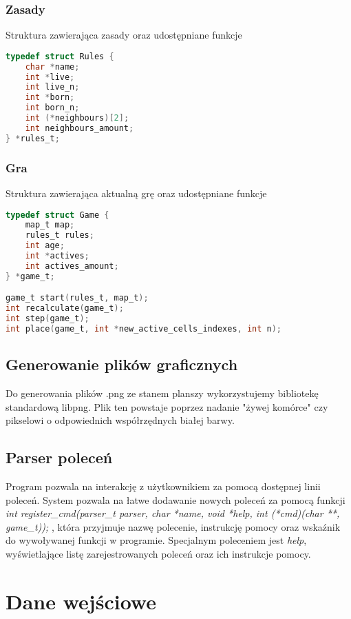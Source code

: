 \documentclass{article}
\begin{document}
\subsubsection{Zasady}
Struktura zawierająca zasady oraz udostępniane funkcje

\begin{lstlisting}[language=C]
typedef struct Rules {
	char *name;
    int *live;
	int live_n;
	int *born;
	int born_n;
	int (*neighbours)[2];
	int neighbours_amount;
} *rules_t;
\end{lstlisting}

\subsubsection{Gra}
Struktura zawierająca aktualną grę oraz udostępniane funkcje

\begin{lstlisting}[language=C]
typedef struct Game {
	map_t map;
	rules_t rules;
    int age;
	int *actives;
	int actives_amount;
} *game_t;

game_t start(rules_t, map_t);
int recalculate(game_t);
int step(game_t);
int place(game_t, int *new_active_cells_indexes, int n);
\end{lstlisting}

\subsection{Generowanie plików graficznych}
Do generowania plików .png ze stanem planszy wykorzystujemy bibliotekę standardową libpng. Plik ten powstaje poprzez nadanie "żywej komórce" czy pikselowi o odpowiednich współrzędnych białej barwy. 
\subsection{Parser poleceń}
Program pozwala na interakcję z użytkownikiem za pomocą dostępnej linii poleceń. System pozwala na łatwe dodawanie nowych poleceń za pomocą funkcji \textit{int register\_cmd(parser\_t parser, char *name, void *help, int (*cmd)(char **, game\_t));} , która przyjmuje nazwę polecenie, instrukcję pomocy oraz wskaźnik do wywoływanej funkcji w programie. Specjalnym poleceniem jest \textit{help}, wyświetlające listę zarejestrowanych poleceń oraz ich instrukcje pomocy.

\section{Dane wejściowe}
\end{document}
